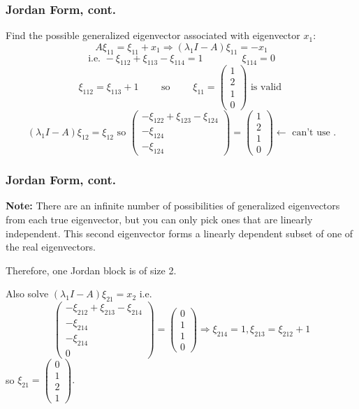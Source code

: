 \documentclass{beamer}
\begin{document}
\begin{frame}\frametitle{Jordan Form, cont.}
	Find the possible generalized eigenvector associated with eigenvector $x_1$:
	\[
		A\xi_{11} = \xi_{11}+x_1 \Rightarrow (\lambda_1 I - A)\xi_{11} = -x_1 
	\]
	\[ 
		\text{i.e. } -\xi_{112} + \xi_{113} - \xi_{114} = 1 \qquad \qquad \xi_{114} = 0 
	\]
	\[ 
		\xi_{112} = \xi_{113} + 1 
		\qquad \text{ so } \qquad 
		\xi_{11} = \begin{pmatrix}1 \\ 2\\ 1 \\ 0 \end{pmatrix} 
		\text{ is valid } 
	\]
	\[ 
		(\lambda_1I-A)\xi_{12} = \xi_{12} 
		\text{ so } 
		\begin{pmatrix}
	    	-\xi_{122} + \xi_{123} - \xi_{124} \\ -\xi_{124} \\ -\xi_{124}
	  	\end{pmatrix}
	  	= \begin{pmatrix}
	    	1\\2\\1\\0
	  	  \end{pmatrix} 
	  	\leftarrow \text{ can't use }. 
	\]	
\end{frame}

\begin{frame}\frametitle{Jordan Form, cont.}
	
	{\bf Note:}
		There are an infinite number of possibilities of generalized eigenvectors from each true eigenvector, but you can only pick ones that are linearly independent.  This second eigenvector forms a linearly dependent subset of one of the real eigenvectors.

	\vfill
	
	Therefore, one Jordan block is of size 2.
	
	\vfill
	
	Also solve $(\lambda_1I-A)\xi_{21} = x_2$ i.e.
	\[ 
		\begin{pmatrix}
	    	-\xi_{212} + \xi_{213} - \xi_{214} \\ -\xi_{214} \\ -\xi_{214} \\ 0
	  	\end{pmatrix}
	  	= \begin{pmatrix}
	    	0\\1\\1\\0
	  	  \end{pmatrix}
	  	\Rightarrow \xi_{214} = 1, \xi_{213} = \xi_{212} + 1 
	\]
	so 
	\(
		\xi_{21} = \begin{pmatrix} 0\\1\\2\\1 \end{pmatrix}.
	\)
\end{frame}
\end{document}
